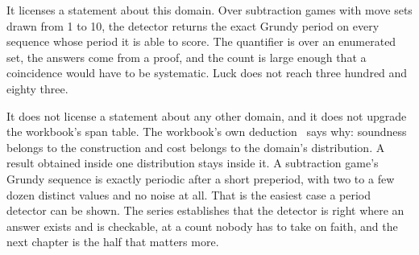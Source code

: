 It licenses a statement about this domain. Over subtraction games with move sets drawn from 1 to 10,
the detector returns the exact Grundy period on every sequence whose period it is able to score. The
quantifier is over an enumerated set, the answers come from a proof, and the count is large enough
that a coincidence would have to be systematic. Luck does not reach three hundred and eighty three.

It does not license a statement about any other domain, and it does not upgrade the workbook's span
table. The workbook's own deduction~\cite{src:Quigg-orior-workbook} says why: soundness belongs to the construction and cost belongs
to the domain's distribution. A result obtained inside one distribution stays inside it. A
subtraction game's Grundy sequence is exactly periodic after a short preperiod, with two to a few
dozen distinct values and no noise at all. That is the easiest case a period detector can be shown. The series establishes that the detector is right where an answer exists and is checkable,
at a count nobody has to take on faith, and the next chapter is the half that matters more.
